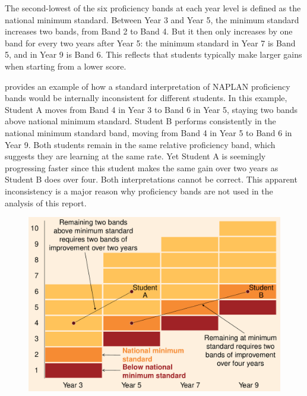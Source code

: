 The second-lowest of the six proficiency bands at each year level is defined as the national minimum standard. Between Year 3 and Year 5, the minimum standard increases two bands, from Band 2 to Band 4. But it then only increases by one band for every two years after Year 5: the minimum standard in Year 7 is Band 5, and in Year 9 is Band 6. This reflects that students typically make larger gains when starting from a lower score. 

 provides an example of how a standard interpretation of NAPLAN proficiency bands would be internally inconsistent for different students. In this example, Student A moves from Band 4 in Year 3 to Band 6 in Year 5, staying two bands above national minimum standard. Student B performs consistently in the national minimum standard band, moving from Band 4 in Year 5 to Band 6 in Year 9. Both students remain in the same relative proficiency band, which suggests they are learning at the same rate. Yet Student A is seemingly progressing faster since this student makes the same gain over two years as Student B does over four. Both interpretations cannot be correct. This apparent inconsistency is a major reason why proficiency bands are not used in the analysis of this report.

\begin{figure}[H]
 \includegraphics[width=\columnwidth]{atlas/NPB.pdf}\label{fig:npb}

\end{figure}


